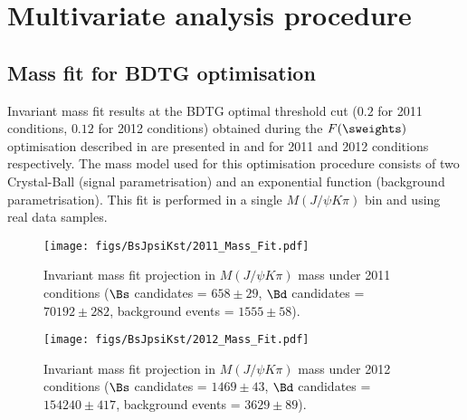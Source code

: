 \cleardoublepage
\chapter{Multivariate analysis procedure}\label{app:BsJpsiKst_selection}
\section{Mass fit for BDTG optimisation}\label{app:BsJpsiKst_selection_opt}
Invariant mass fit results at the BDTG optimal threshold cut ($0.2$ for 2011 conditions, $0.12$ for 2012 conditions) obtained during the $F(\sweights)$ optimisation described in  are presented in  and  for 2011 and 2012 conditions respectively. The mass model used for this optimisation procedure consists of two Crystal-Ball \cite{CrystalBall} (signal parametrisation) and an exponential function (background parametrisation). This fit is performed in a single $M(J/\psi{K\pi})$ bin and using real data samples.
%
\begin{figure}[h]
\begin{center}
\texttt{[image: figs/BsJpsiKst/2011\_Mass\_Fit.pdf]}
\caption{Invariant mass fit projection in $M(J/\psi{K\pi})$ mass under 2011 conditions ($\Bs$ candidates = $658 \pm 29$, $\Bd$ candidates = $70192 \pm 282$, background events = $1555 \pm 58$).}
\label{fig:appMassFitFoM2011}
\end{center}
\end{figure}
%
\begin{figure}[h]
\begin{center}
\texttt{[image: figs/BsJpsiKst/2012\_Mass\_Fit.pdf]}
\caption{Invariant mass fit projection in $M(J/\psi{K\pi})$ mass under 2012 conditions ($\Bs$ candidates = $1469 \pm 43$, $\Bd$ candidates = $154240 \pm 417$, background events = $3629 \pm 89$).}
\label{fig:appMassFitFoM2012}
\end{center}
\end{figure}
%
